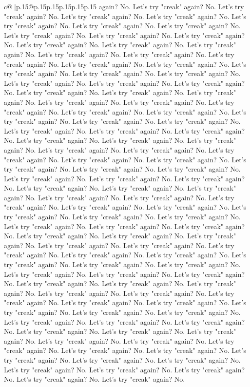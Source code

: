 \documentclass{article}
\begin{document}
{\begin{supertabular}{c@{$\;$}|p{.15\linewidth}@{}p{.15\linewidth}p{.15\linewidth}p{.15\linewidth}p{.15\linewidth}p{.15\linewidth}}
{{{again? No. Let's try "creak" again? No. Let's try "creak" again? No. Let's try "creak" again? No. Let's try "creak" again? No. Let's try "creak" again? No. Let's try "creak" again? No. Let's try "creak" again? No. Let's try "creak" again? No. Let's try "creak" again? No. Let's try "creak" again? No. Let's try "creak" again? No. Let's try "creak" again? No. Let's try "creak" again? No. Let's try "creak" again? No. Let's try "creak" again? No. Let's try "creak" again? No. Let's try "creak" again? No. Let's try "creak" again? No. Let's try "creak" again? No. Let's try "creak" again? No. Let's try "creak" again? No. Let's try "creak" again? No. Let's try "creak" again? No. Let's try "creak" again? No. Let's try "creak" again? No. Let's try "creak" again? No. Let's try "creak" again? No. Let's try "creak" again? No. Let's try "creak" again? No. Let's try "creak" again? No. Let's try "creak" again? No. Let's try "creak" again? No. Let's try "creak" again? No. Let's try "creak" again? No. Let's try "creak" again? No. Let's try "creak" again? No. Let's try "creak" again? No. Let's try "creak" again? No. Let's try "creak" again? No. Let's try "creak" again? No. Let's try "creak" again? No. Let's try "creak" again? No. Let's try "creak" again? No. Let's try "creak" again? No. Let's try "creak" again? No. Let's try "creak" again? No. Let's try "creak" again? No. Let's try "creak" again? No. Let's try "creak" again? No. Let's try "creak" again? No. Let's try "creak" again? No. Let's try "creak" again? No. Let's try "creak" again? No. Let's try "creak" again? No. Let's try "creak" again? No. Let's try "creak" again? No. Let's try "creak" again? No. Let's try "creak" again? No. Let's try "creak" again? No. Let's try "creak" again? No. Let's try "creak" again? No. Let's try "creak" again? No. Let's try "creak" again? No. Let's try "creak" again? No. Let's try "creak" again? No. Let's try "creak" again? No. Let's try "creak" again? No. Let's try "creak" again? No. Let's try "creak" again? No. Let's try "creak" again? No. Let's try "creak" again? No. Let's try "creak" again? No. Let's try "creak" again? No. Let's try "creak" again? No. Let's try "creak" again? No. Let's try "creak" again? No. Let's try "creak" again? No. Let's try "creak" again? No. Let's try "creak" again? No. Let's try "creak" again? No. Let's try "creak" again? No. Let's try "creak" again? No. Let's try "creak" again? No. Let's try "creak" again? No. Let's try "creak" again? No. Let's try "creak" again? No. Let's try "creak" again? No. Let's try "creak" again? No. Let's try "creak" again? No. Let's try "creak" again? No. Let's try "creak" again? No. Let's try "creak" again? No. Let's try "creak" again? No. Let's try "creak" again? No. Let's try "creak" again? No. Let's try "creak" again? No. Let's try "creak" again? No. Let's try "creak" again? No. Let's try "creak" again? No. Let's try "creak" again? No. Let's try "creak" again? No. Let's try "creak" again? No. Let's try "creak" again? No. Let's try "creak" again? No. Let's try "creak" again? No. Let's try "creak" again? No. Let's try "creak" again? No. Let's try "creak" again? No. Let's try "creak" again? No. Let's try "creak" again? No. }}}
\end{supertabular}}
\end{document}
